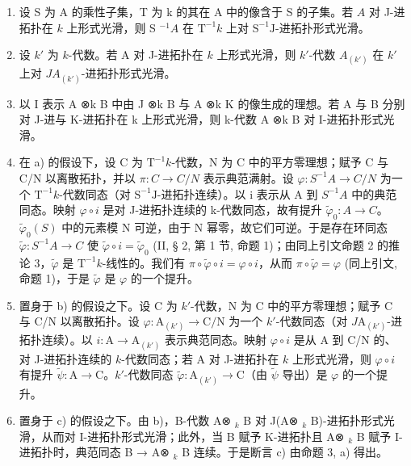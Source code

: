 \begin{enumerate}
\def\labelenumi{\alph{enumi})}
\item
  设 S 为 A 的乘性子集，T 为 k 的其在 A 中的像含于 S 的子集。若 \(A\) 对 J-进拓扑在 \(k\) 上形式光滑，则 S \(^{-1}A\) 在 \(\mathrm{T}^{-1}k\) 上对 \(\mathrm{S}^{-1}\mathrm{J}\)-进拓扑形式光滑。
\item
  设 \(k'\) 为 \(k\)-代数。若 A 对 J-进拓扑在 \(k\) 上形式光滑，则 \(k'\)-代数 \(A_{(k')}\) 在 \(k'\) 上对 \(JA_{(k')}\)-进拓扑形式光滑。
\item
  以 I 表示 A ⊗k B 中由 J ⊗k B 与 A ⊗k K 的像生成的理想。若 A 与 B 分别对 J-进与 K-进拓扑在 k 上形式光滑，则 k-代数 A ⊗k B 对 I-进拓扑形式光滑。
\item
  在 a) 的假设下，设 C 为 \(\mathrm{T}^{-1}k\)-代数，N 为 C 中的平方零理想；赋予 C 与 C/N 以离散拓扑，并以 \(\pi : C \to C/N\) 表示典范满射。设 \(\varphi : S^{-1}A \longrightarrow C/N\) 为一个 \(\mathrm{T}^{-1}k\)-代数同态（对 \(\mathrm{S}^{-1}\mathrm{J}\)-进拓扑连续）。以 i 表示从 A 到 \(S^{-1}A\) 中的典范同态。映射 \(\varphi \circ i\) 是对 J-进拓扑连续的 k-代数同态，故有提升 \(\tilde{\varphi}_{0} : A \to C\)。\(\tilde{\varphi}_{0}(S)\) 中的元素模 N 可逆，由于 N 幂零，故它们可逆。于是存在环同态 \(\tilde{\varphi} : S^{-1}A \to C\) 使 \(\tilde{\varphi} \circ i = \tilde{\varphi}_{0}\) (II, § 2, 第 1 节, 命题 1)；由同上引文命题 2 的推论 3，\(\tilde{\varphi}\) 是 \(\mathrm{T}^{-1}k\)-线性的。我们有 \(\pi \circ \tilde{\varphi} \circ i = \varphi \circ i\)，从而 \(\pi \circ \tilde{\varphi} = \varphi\) (同上引文, 命题 1)，于是 \(\tilde{\varphi}\) 是 \(\varphi\) 的一个提升。
\item
  置身于 b) 的假设之下。设 C 为 \(k'\)-代数，N 为 C 中的平方零理想；赋予 C 与 C/N 以离散拓扑。设 \(\varphi : \mathrm{A}_{(k')} \longrightarrow \mathrm{C/N}\) 为一个 \(k'\)-代数同态（对 \(J\mathrm{A}_{(k')}\)-进拓扑连续）。以 \(i : \mathrm{A} \to \mathrm{A}_{(k')}\) 表示典范同态。映射 \(\varphi \circ i\) 是从 A 到 C/N 的、对 J-进拓扑连续的 \(k\)-代数同态；若 A 对 J-进拓扑在 \(k\) 上形式光滑，则 \(\varphi \circ i\) 有提升 \(\tilde{\psi} : \mathrm{A} \to \mathrm{C}\)。\(k'\)-代数同态 \(\tilde{\varphi} : \mathrm{A}_{(k')} \longrightarrow \mathrm{C}\)（由 \(\tilde{\psi}\) 导出）是 \(\varphi\) 的一个提升。
\item
  置身于 c) 的假设之下。由 b)，B-代数 A⊗ \(_{k}\) B 对 J(A⊗ \(_{k}\) B)-进拓扑形式光滑，从而对 I-进拓扑形式光滑；此外，当 B 赋予 K-进拓扑且 A⊗ \(_{k}\) B 赋予 I-进拓扑时，典范同态 B → A⊗ \(_{k}\) B 连续。于是断言 c) 由命题 3, a) 得出。
\end{enumerate}

